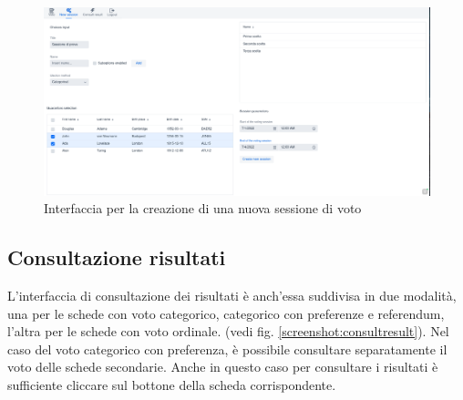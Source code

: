 \begin{figure}
	\centering
	\includegraphics[height=0.8\textwidth, angle=90]{img/gui/newSession.png}
	\caption{Interfaccia per la creazione di una nuova sessione di voto}
	\label{screenshot:newsession}
\end{figure}

\subsection{Consultazione risultati}
L'interfaccia di consultazione dei risultati è anch'essa suddivisa in due modalità, una per le schede con voto categorico, categorico con preferenze e referendum, l'altra per le schede con voto ordinale. (vedi fig. \ref{screenshot:consultresult}). Nel caso del voto categorico con preferenza, è possibile consultare separatamente il voto delle schede secondarie.
Anche in questo caso per consultare i risultati è sufficiente cliccare sul bottone della scheda corrispondente.

